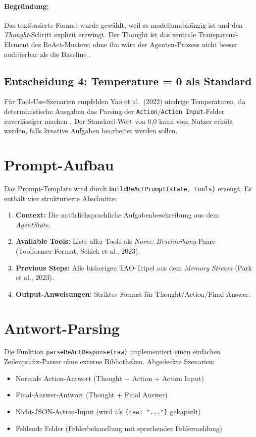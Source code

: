\documentclass[12pt,a4paper,oneside]{report}
\begin{document}
\paragraph{Begründung:}
Das textbasierte Format wurde gewählt, weil es modellunabhängig ist und den
\textit{Thought}-Schritt explizit erzwingt. Der Thought ist das zentrale
Transparenz-Element des ReAct-Musters; ohne ihn wäre der Agenten-Prozess nicht
besser auditierbar als die Baseline \cite{yao2022react}.

\subsection{Entscheidung 4: Temperature = 0 als Standard}

Für Tool-Use-Szenarien empfehlen Yao et al.\ (2022) niedrige Temperaturen, da
deterministische Ausgaben das Parsing der \texttt{Action}/\texttt{Action Input}-Felder
zuverlässiger machen \cite{yao2022react}. Der Standard-Wert von 0,0 kann vom Nutzer
erhöht werden, falls kreative Aufgaben bearbeitet werden sollen.

\section{Prompt-Aufbau}

Das Prompt-Template wird durch \texttt{buildReActPrompt(state, tools)} erzeugt.
Es enthält vier strukturierte Abschnitte:

\begin{enumerate}
  \item \textbf{Context:} Die natürlichsprachliche Aufgabenbeschreibung aus dem
    \textit{AgentState}.
  \item \textbf{Available Tools:} Liste aller Tools als \textit{Name: Beschreibung}-Paare
    (Toolformer-Format, Schick et al., 2023).
  \item \textbf{Previous Steps:} Alle bisherigen \ac{TAO}-Tripel aus dem
    \textit{Memory Stream} (Park et al., 2023).
  \item \textbf{Output-Anweisungen:} Striktes Format für Thought/Action/Final Answer.
\end{enumerate}

\section{Antwort-Parsing}

Die Funktion \texttt{parseReActResponse(raw)} implementiert einen einfachen
Zeilenpräfix-Parser ohne externe Bibliotheken. Abgedeckte Szenarien:
\begin{itemize}
  \item Normale Action-Antwort (Thought + Action + Action Input)
  \item Final-Answer-Antwort (Thought + Final Answer)
  \item Nicht-JSON-Action-Input (wird als \texttt{\{raw: "..."\}} gekapselt)
  \item Fehlende Felder (Fehlerbehandlung mit sprechender Fehlermeldung)
\end{itemize}
\end{document}
